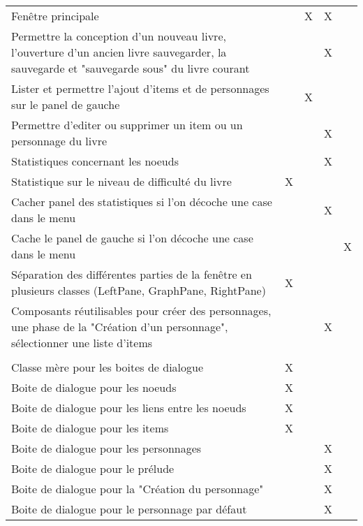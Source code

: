 \begin{centering}
\begin{longtable}{|p{8cm}|c|c|c|c|}
			\rowcolor{lightgray} \multicolumn{5}{|c|}{ \textbf{Fenêtre}}\\
			\hline
			Fenêtre principale & & X & X & \\
			\hline
			Permettre la conception d'un nouveau livre, l'ouverture d'un ancien livre sauvegarder, la sauvegarde et "sauvegarde sous" du livre courant & & & X & \\
			\hline
			Lister et permettre l'ajout d'items et de personnages sur le panel de gauche& & X & & \\
			\hline
			Permettre d'editer ou supprimer un item ou un personnage du livre & & & X & \\
			\hline
			Statistiques concernant les noeuds & & & X & \\
			\hline
			Statistique sur le niveau de difficulté du livre & X & & & \\
			\hline
			Cacher panel des statistiques si l'on décoche une case dans le menu & & & X & \\
			\hline
			Cache le panel de gauche si l'on décoche une case dans le menu& & & & X\\
			\hline
			Séparation des différentes parties de la fenêtre en plusieurs classes (LeftPane, GraphPane, RightPane) & X & & & \\
			\hline
			Composants réutilisables pour créer des personnages, une phase de la "Création d'un personnage", sélectionner une liste d'items & & & X & \\
			\hline

			\rowcolor{lightgray} \multicolumn{5}{|c|}{ \textbf{Boites de dialogues}}\\
			\hline
			Classe mère pour les boites de dialogue & X & & &\\
			\hline
			Boite de dialogue pour les noeuds & X & & & \\
			\hline
			Boite de dialogue pour les liens entre les noeuds & X & & & \\
			\hline
			Boite de dialogue pour les items & X & & & \\
			\hline
			Boite de dialogue pour les personnages & & & X & \\
			\hline
			Boite de dialogue pour le prélude & & & X & \\
			\hline
			Boite de dialogue pour la "Création du personnage" & & & X & \\
			\hline
			Boite de dialogue pour le personnage par défaut & & & X & \\
			\hline


\end{longtable}
\end{centering}
